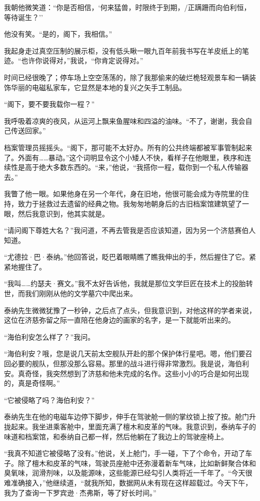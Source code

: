 \documentclass[AutoFakeBold=true]{book}
\begin{document}
我朝他微笑道：``你是否相信，`何来猛兽，时限终于到期，/正蹒跚而向伯利恒，等待诞生？''

他没有笑。``是的，阁下，我相信。''

我起身走过真空压制的展示柜，没有低头瞅一眼九百年前我书写在羊皮纸上的笔迹。``也许你说得对，''我说，``你肯定说得对。''

\vspace*{1em}

时间已经很晚了；停车场上空空荡荡的，除了我那偷来的破烂桅轻观景车和一辆装饰华丽的电磁私家车，它显然是本地的复兴之矢手工制品。

``阁下，要不要我载你一程？''

我呼吸着凉爽的夜风，从运河上飘来鱼腥味和四溢的油味。``不了，谢谢，我会自己传送回家。''

档案管理员摇摇头。``阁下，那可能不太好办。所有的公共终端都被军事管制起来了。外面有……暴动。''这个词明显令这个小矮人不快，看样子在他眼里，秩序和连续性是高于绝大多数东西的。``来，''他说，``我搭你一程，载你到一个私人传输器去。''

我瞥了他一眼。如果他身在另一个年代，身在旧地，他很可能会成为寺院里的住持，致力于拯救过去遗留的经典之物。我匆匆地朝身后的古旧档案馆建筑望了一眼，然后我意识到，他其实就是。

``请问阁下尊姓大名？''我问道，不再去管我是否应该知道，因为另一个济慈赛伯人知道。

``尤德拉·巴·泰纳。''他回答说，眨巴着眼睛瞧了瞧我伸出的手，然后握住了它。紧紧地握住了。

``我叫……约瑟夫·赛文。''我不太好告诉他，我就是那位文学巨匠在技术上的投胎转世，而我们刚刚从他的文学墓穴中爬出来。

泰纳先生微微犹豫了一秒钟，之后点了点头，但我意识到，对他这样的学者来说，这位在济慈弥留之际一直陪在他身边的画家的名字，是一下就能听出来的。

``海伯利安怎么样了？''我问。

``海伯利安？哦，您是说几天前太空舰队开赴的那个保护体行星吧。嗯，他们要召回必要的舰队，但那没那么容易。那里的战斗进行得非常激烈。我是说，海伯利安。真奇怪，我突然想到了济慈和他未完成的名作。这些小小的巧合是如何出现的，真是奇怪啊。''

``它被侵略了吗？海伯利安？''

泰纳先生在他的电磁车边停下脚步，伸手在驾驶舱一侧的掌纹锁上按了按。舱门升拢起来。我坐进乘客舱中，里面充满了檀木和皮革的气味。我意识到，泰纳车子的味道和档案馆，和泰纳自己都一样，然后他躺在了我边上的驾驶座椅上。

``我真不知道它被侵略了没有。''他说，关上舱门，手一碰，下了个命令，开动了车子。除了檀木和皮革的气味，驾驶员座舱中还弥漫着新车气味，比如新鲜聚合体和臭氧味，润滑剂味，以及能源味，这些能源已经勾引人类将近一千年了。``今天很难准确接入，''他继续道，``就我所知，数据网从未有现在这样超载过。今天下午，我为了查询一下罗宾逊·杰弗斯，等了好长时间。''
\end{document}
